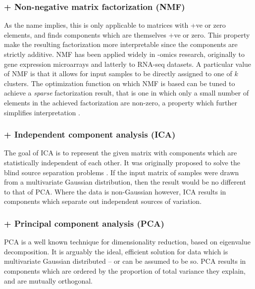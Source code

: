 \documentclass[tikz, 11pt,a4paper,oneside,fleqn, draft]{article}
\begin{document}
\subsubsection{+ Non-negative matrix factorization (NMF)}
\label{sec-nmf}
As the name implies, this is only applicable to matrices with +ve or zero elements, and finds components which are themselves +ve or zero.   This property make the resulting factorization more interpretable since the components are strictly additive.   
NMF has been applied widely in -omics research, originally to gene expression microarrays  and latterly to RNA-seq datasets.  
A particular value of NMF is that it allows for input samples to be directly assigned to one of $k$ clusters.   
The optimization function on which NMF is based can be tuned to achieve a \emph{sparse} factorization result, that is one in which only a small number of elements in the achieved factorization are non-zero, a property which further simplifies interpretation \cite{Brunet2004}.
%
\subsubsection{+ Independent component analysis (ICA)} 
The goal of ICA is to represent the given matrix with components which are statistically independent of each other.  It was originally proposed to solve the blind source separation problems \cite{Comon1994}. If the input matrix of samples were drawn from a multivariate Gaussian distribution, then the result would be no different to that of PCA.    Where the data is non-Gaussian however, ICA results in components which separate out independent sources of variation.  

\subsubsection{+ Principal component analysis (PCA)}
PCA is a well known technique for dimensionality reduction, based on eigenvalue decomposition.  It is arguably the ideal, efficient solution for data which is multivariate Gaussian distributed -- or can be assumed to be so.  PCA results in components which are ordered by the proportion of total variance they explain, and are mutually orthogonal.


\end{document}
